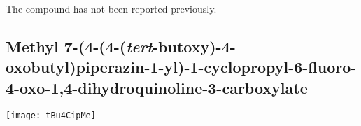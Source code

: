 \\[1\baselineskip]
\\[1\baselineskip]
\\[1\baselineskip]
The compound has not been reported previously.

%
%

\subsection{Methyl 7\hyp{}(4\hyp{}(4\hyp{}(\textit{tert}\hyp{}butoxy)\hyp{}4\hyp{}oxobutyl)piperazin\hyp{}1\hyp{}yl)\hyp{}1\hyp{}cyclopropyl\hyp{}6\hyp{}fluoro\hyp{}4\hyp{}oxo\hyp{}1,4\hyp{}dihydroquinoline\hyp{}3\hyp{}carboxylate }


\begin{scheme}[H]
	\begin{center}
		\texttt{[image: tBu4CipMe]}
	\end{center}
\end{scheme}

